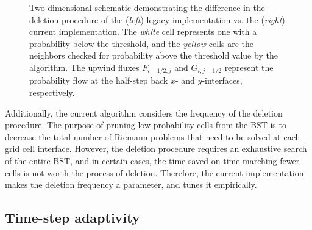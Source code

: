 \documentclass[paper,11pt]{AAS}
\begin{document}
\begin{figure}[htb]
  \caption{Two-dimensional schematic demonstrating the difference in the deletion procedure of the ({\it left}) legacy implementation vs. the ({\it right}) current implementation. The {\it white} cell represents one with a probability below the threshold, and the {\it yellow} cells are the neighbors checked for probability above the threshold value by the algorithm. The upwind fluxes $F_{i-1/2,j}$ and $G_{i,j-1/2}$ represent the probability flow at the half-step back $x$- and $y$-interfaces, respectively.}
  \label{fig:Deletion}
\end{figure}

Additionally, the current algorithm considers the frequency of the deletion procedure. The purpose of pruning low-probability cells from the BST is to decrease the total number of Riemann problems that need to be solved at each grid cell interface. However, the deletion procedure requires an exhaustive search of the entire BST, and in certain cases, the time saved on time-marching fewer cells is not worth the process of deletion. Therefore, the current implementation makes the deletion frequency a parameter, and tunes it empirically. 

\subsection{Time-step adaptivity}
\end{document}
